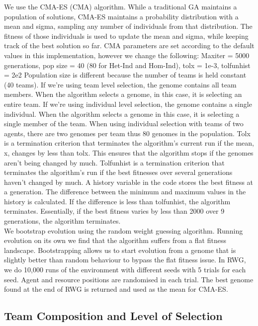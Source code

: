 \documentclass[12pt]{article}  %
\begin{document}
We use the CMA-ES (CMA) algorithm. 
While a traditional GA maintains a population of solutions, CMA-ES maintains a probability distribution with a mean and sigma, sampling any number of individuals from that distribution. 
The fitness of those individuals is used to update the mean and sigma, while keeping track of the best solution so far. 
CMA parameters are set according to the default values in this implementation, however we change the following:
Maxiter = 5000 generations, pop size = 40 (80 for Het-Ind and Hom-Ind), tolx = 1e-3, tolfunhist = 2e2
Population size is different because the number of teams is held constant (40 teams). 
If we're using team level selection, the genome contains all team members. 
When the algorithm selects a genome, in this case, it is selecting an entire team.
If we're using individual level selection, the genome contains a single individual. 
When the algorithm selects a genome in this case, it is selecting a single member of the team. 
When using individual selection with teams of two agents, there are two genomes per team thus 80 genomes in the population.
Tolx is a termination criterion that terminates the algorithm's current run if the mean, x, changes by less than tolx. 
This ensures that the algorithm stops if the genomes aren’t being changed by much. 
Tolfunhist is a termination criterion that terminates the algorithm's run if the best fitnesses over several generations haven't changed by much. 
A history variable in the code stores the best fitness at a generation. 
The difference between the minimum and maximum values in the history is calculated. 
If the difference is less than tolfunhist, the algorithm terminates. 
Essentially, if the best fitness varies by less than 2000 over 9 generations, the algorithm terminates.\\
 
We bootstrap evolution using the random weight guessing algorithm. 
Running evolution on its own we find that the algorithm suffers from a flat fitness landscape.
Bootstrapping allows us to start evolution from a genome that is slightly better than random behaviour to bypass the flat fitness issue.
In RWG, we do 10,000 runs of the environment with different seeds with 5 trials for each seed. 
Agent and resource positions are randomised in each trial.
The best genome found at the end of RWG is returned and used as the mean for CMA-ES.

\subsection{Team Composition and Level of Selection}
\end{document}
